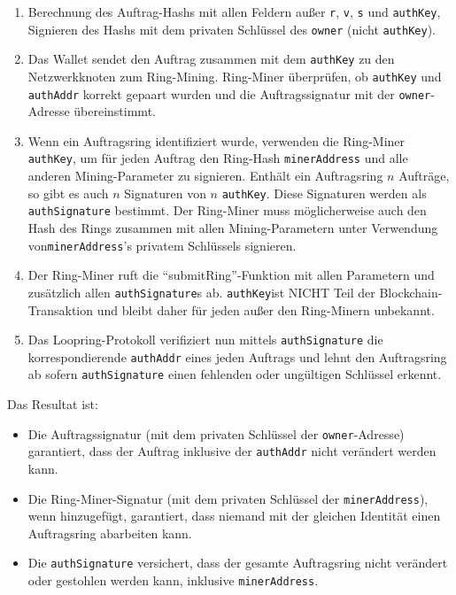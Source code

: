 \documentclass[UTF8,nofonts]{article}
\begin{document}
\begin{multicols}{2}
\begin{enumerate}
	\item Berechnung des Auftrag-Hashs mit allen Feldern außer \verb|r|, \verb|v|, \verb|s| und \verb|authKey|, Signieren des Hashs mit dem privaten Schlüssel des \verb|owner| (nicht \verb|authKey|).

	\item Das Wallet sendet den Auftrag zusammen mit dem \verb|authKey| zu den Netzwerkknoten zum Ring-Mining. Ring-Miner überprüfen, ob \verb|authKey| und \verb|authAddr| korrekt gepaart wurden und die Auftragssignatur mit der \verb|owner|-Adresse übereinstimmt.

	\item Wenn ein Auftragsring identifiziert wurde, verwenden die Ring-Miner \verb|authKey|, um für jeden Auftrag den Ring-Hash \verb|minerAddress| und alle anderen Mining-Parameter zu signieren. Enthält ein Auftragsring $n$ Aufträge, so gibt es auch $n$ Signaturen von $n$ \verb|authKey|. Diese Signaturen werden als \verb|authSignature| bestimmt. Der Ring-Miner muss möglicherweise auch den Hash des Rings zusammen mit allen Mining-Parametern unter Verwendung von\verb|minerAddress|'s privatem Schlüssels signieren.

	\item Der Ring-Miner ruft die \enquote{submitRing}-Funktion mit allen Parametern und zusätzlich allen \verb|authSignature|s ab. \verb|authKey|ist NICHT Teil der Blockchain-Transaktion und bleibt daher für jeden außer den Ring-Minern unbekannt.

	\item Das Loopring-Protokoll verifiziert nun mittels \verb|authSignature| die korrespondierende \verb|authAddr| eines jeden Auftrags und lehnt den Auftragsring ab sofern \verb|authSignature| einen fehlenden oder ungültigen Schlüssel erkennt.
 
\end{enumerate}

Das Resultat ist:

\begin{itemize}

	\item  Die Auftragssignatur (mit dem privaten Schlüssel der \verb|owner|-Adresse) garantiert, dass der Auftrag inklusive der \verb|authAddr| nicht verändert werden kann.
	\item  Die Ring-Miner-Signatur (mit dem privaten Schlüssel der \verb|minerAddress|), wenn hinzugefügt, garantiert, dass niemand mit der gleichen Identität einen Auftragsring abarbeiten kann.
	\item  Die \verb|authSignature| versichert, dass der gesamte Auftragsring nicht verändert oder gestohlen werden kann, inklusive \verb|minerAddress|.


\end{itemize}
\end{multicols}
\end{document}
